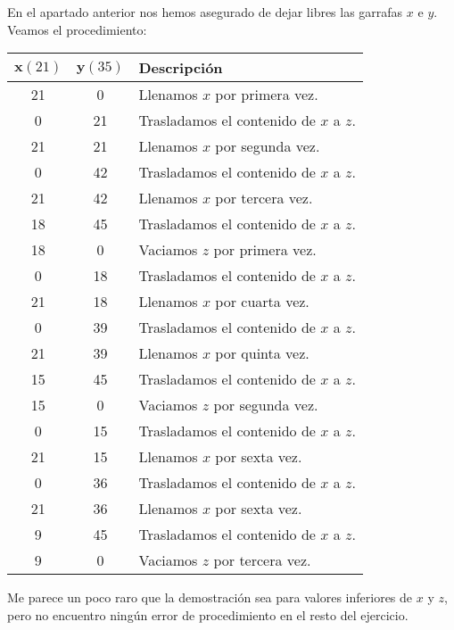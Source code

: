 En el apartado anterior nos hemos asegurado de dejar libres las garrafas $x$ e $y$.
Veamos el procedimiento:

\begin{center}
\begin{tabular}{c c l}
	$\boldsymbol{x} (21)$ & $\boldsymbol{y} (35)$ & \textbf{Descripción}                   \\
	\toprule
	21                    & 0                     & Llenamos $x$ por primera vez.          \\
	0                     & 21                    & Trasladamos el contenido de $x$ a $z$. \\
	21                    & 21                    & Llenamos $x$ por segunda vez.          \\
	0                     & 42                    & Trasladamos el contenido de $x$ a $z$. \\
	21                    & 42                    & Llenamos $x$ por tercera vez.          \\
	18                    & 45                    & Trasladamos el contenido de $x$ a $z$. \\
	18                    & 0                     & Vaciamos $z$ por primera vez.          \\
	0                     & 18                    & Trasladamos el contenido de $x$ a $z$. \\
	21                    & 18                    & Llenamos $x$ por cuarta vez.           \\
	0                     & 39                    & Trasladamos el contenido de $x$ a $z$. \\
	21                    & 39                    & Llenamos $x$ por quinta vez.           \\
	15                    & 45                    & Trasladamos el contenido de $x$ a $z$. \\
	15                    & 0                     & Vaciamos $z$ por segunda vez.          \\
	0                     & 15                    & Trasladamos el contenido de $x$ a $z$. \\
	21                    & 15                    & Llenamos $x$ por sexta vez.            \\
	0                     & 36                    & Trasladamos el contenido de $x$ a $z$. \\
	21                    & 36                    & Llenamos $x$ por sexta vez.            \\
	9                     & 45                    & Trasladamos el contenido de $x$ a $z$. \\
	9                     & 0                     & Vaciamos $z$ por tercera vez.          \\
\end{tabular}
\end{center}

Me parece un poco raro que la demostración sea para valores inferiores de $x$ y $z$, pero no encuentro ningún error de procedimiento en el resto del ejercicio.
